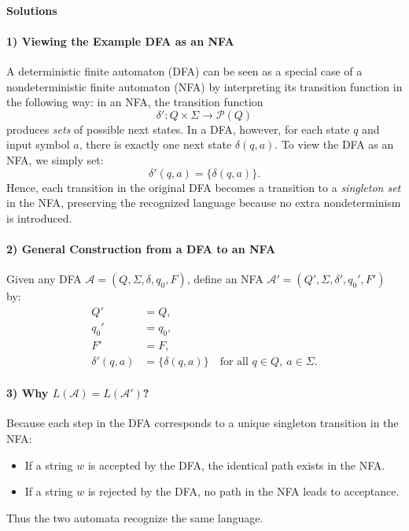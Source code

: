 \documentclass{article}
\theoremstyle{theorem}
\theoremstyle{definition}
\theoremstyle{remark}
\begin{document}
\newpage

\paragraph*{Solutions}
\paragraph{1) Viewing the Example DFA as an NFA}  
A deterministic finite automaton (DFA) can be seen as a special case of a nondeterministic finite automaton (NFA) by interpreting its transition function in the following way: in an NFA, the transition function 
\[
\delta': Q \times \Sigma \to \mathcal{P}(Q)
\]
produces \emph{sets} of possible next states. In a DFA, however, for each state \(q\) and input symbol \(a\), there is exactly one next state \(\delta(q,a)\). To view the DFA as an NFA, we simply set:
\[
\delta'(q,a) = \{\delta(q,a)\}.
\]
Hence, each transition in the original DFA becomes a transition to a \emph{singleton set} in the NFA, preserving the recognized language because no extra nondeterminism is introduced.

\paragraph{2) General Construction from a DFA to an NFA}  
Given any DFA 
\(\mathcal{A} = (Q, \Sigma, \delta, q_0, F)\),
define an NFA
\(\mathcal{A}' = (Q', \Sigma, \delta', q_0', F')\) by:
\[
\begin{aligned}
Q' &= Q,\\
q_0' &= q_0,\\
F' &= F,\\
\delta'(q,a) &= \{\delta(q,a)\} \quad\text{for all }q\in Q,\ a\in\Sigma.
\end{aligned}
\]

\paragraph{3) Why \(L(\mathcal{A}) = L(\mathcal{A}')\)?}  
Because each step in the DFA corresponds to a unique singleton transition in the NFA:
\begin{itemize}
  \item If a string \(w\) is accepted by the DFA, the identical path exists in the NFA.
  \item If a string \(w\) is rejected by the DFA, no path in the NFA leads to acceptance.
\end{itemize}
Thus the two automata recognize the same language.
\end{document}
